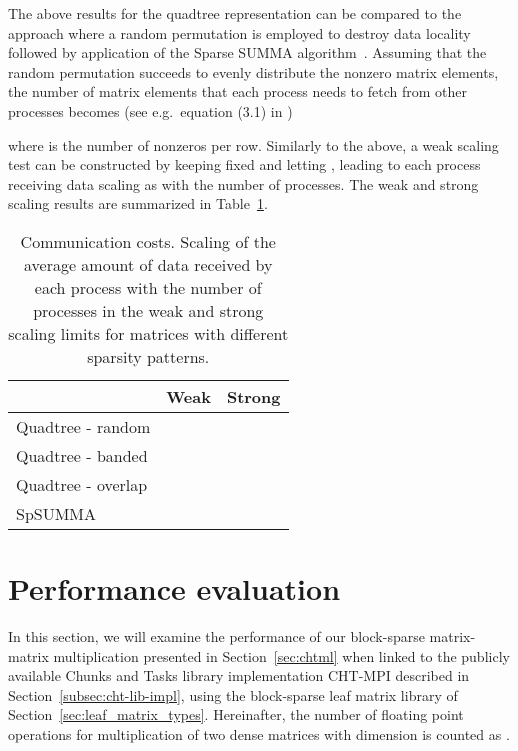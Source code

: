 \documentclass{elsarticle}
\begin{document}
The above results for the quadtree representation can be compared to
the approach where a random permutation is employed to destroy data
locality followed by application of the Sparse SUMMA
algorithm~\cite{SparseSUMMA2008}.  Assuming that the random
permutation succeeds to evenly distribute the nonzero matrix elements,
the number of matrix elements that each process needs to fetch from
other processes becomes (see e.g.~equation (3.1) in
\cite{BulucGilbert2012})

where  is the number of nonzeros per row. Similarly to the above, a
weak scaling test can be constructed by keeping  fixed and letting
, leading to each process receiving data scaling as
 with the number of processes. The weak and
strong scaling results are summarized in
Table~\ref{tbl:weak_and_strong_scaling}.




\begin{table}
\begin{center}
\begin{tabular}{lcc}
  \hline
  & Weak & Strong \\
  \hline
  \hline
  Quadtree - random  &    &  \\
  Quadtree - banded  &           &  \\
  Quadtree - overlap &           &  \\
  \hline
  SpSUMMA &   & \\
  \hline
\end{tabular}
\end{center}
\caption{Communication costs. Scaling of the average amount of data received
  by each process with the number of processes  in the weak and
  strong scaling limits for matrices with different sparsity
  patterns.  \label{tbl:weak_and_strong_scaling}}
\end{table}

\section{Performance evaluation}\label{sec:performance}
In this section, we will examine the performance of our block-sparse
matrix-matrix multiplication presented in Section~\ref{sec:chtml} when
linked to the publicly available Chunks and Tasks library
implementation CHT-MPI described in Section~\ref{subsec:cht-lib-impl},
using the block-sparse leaf matrix library of
Section~\ref{sec:leaf_matrix_types}.  Hereinafter, the number of
floating point operations for multiplication of two dense matrices
with dimension  is counted as .
\end{document}
